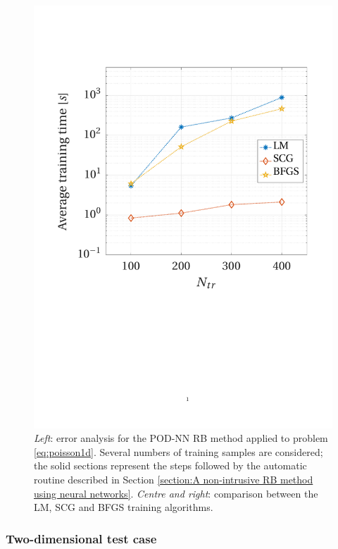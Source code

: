 \documentclass[longtitle]{elsarticle}
\numberwithin{equation}{section}
\theoremstyle{theorem}
\theoremstyle{definition}
\theoremstyle{remark}
\theoremstyle{proposition}
\numberwithin{figure}{section}
\begin{document}
\begin{figure}[t!]
			\includegraphics[scale = 0.3, trim = {1cm 9.8cm 1.5cm 3.5cm}, clip]{poisson1d_training_comparison_time}
			
			\caption{\emph{Left}: error analysis for the POD-NN RB method applied to problem \eqref{eq:poisson1d}. Several numbers of training samples are considered; the solid sections represent the steps followed by the automatic routine described in Section \ref{section:A non-intrusive RB method using neural networks}. \emph{Centre and right}: comparison between the LM, SCG and BFGS training algorithms.}
			\label{fig:poisson1d-fig2}
		\end{figure}
				
		
	
	\subsubsection{Two-dimensional test case}
	\label{section:Two-dimensional test case}
		
\end{document}
